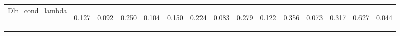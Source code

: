 \begin{center}
\begin{tabular}{lcccccccccccccc}
\noalign{\smallskip}Dln_cond_lambda & \begin{normalsize}0.127\end{normalsize} & \begin{normalsize}0.092\end{normalsize} & \begin{normalsize}0.250\end{normalsize} & \begin{normalsize}0.104\end{normalsize} & \begin{normalsize}0.150\end{normalsize} & \begin{normalsize}0.224\end{normalsize} & \begin{normalsize}0.083\end{normalsize} & \begin{normalsize}0.279\end{normalsize} & \begin{normalsize}0.122\end{normalsize} & \begin{normalsize}0.356\end{normalsize} & \begin{normalsize}0.073\end{normalsize} & \begin{normalsize}0.317\end{normalsize} & \begin{normalsize}0.627\end{normalsize} & \begin{normalsize}0.044\end{normalsize}\\

\end{tabular}
\end{center}

